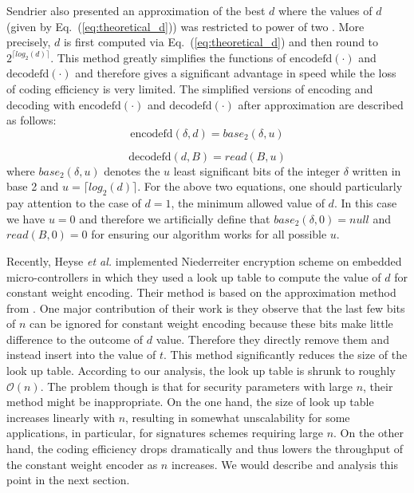 \documentclass[10pt,journal,compsoc]{IEEEtran}
\begin{document}
Sendrier also presented an approximation of the best $d$ where the values of $d$ (given by Eq.~(\ref{eq:theoretical_d})) was restricted to power of two \cite{sendrier2005encoding}. More precisely, $d$ is first computed via Eq.~(\ref{eq:theoretical_d}) and then round to $2^{\lceil log_2(d)\rceil}$.
This method greatly simplifies the functions of $\text{encodefd}(\cdot)$ and $\text{decodefd}(\cdot)$  and therefore gives a significant advantage in speed while the loss of coding efficiency is very limited.  The simplified versions of encoding and decoding with $\text{encodefd}(\cdot)$ and $\text{decodefd}(\cdot)$ after approximation are described as follows:
\begin{equation}
\text{encodefd}(\delta,d) = base_2(\delta,u)
\end{equation}

\begin{equation}
\text{decodefd}(d,B) = read(B,u)
\end{equation}
where $base_2(\delta,u)$ denotes the $u$ least significant bits of the integer $\delta$ written in base 2 and $u = {\lceil log_2(d)\rceil}$. For the
above two equations, one should particularly pay attention to the case of $d=1$, the minimum allowed value of $d$. In this case we have $u=0$
and therefore we artificially define that $base_2(\delta,0) = null$ and $read(B,0)=0$ for ensuring our algorithm works for all possible $u$.

Recently, Heyse \textit{et al.} implemented Niederreiter encryption scheme on embedded micro-controllers in which they used a look up table to
compute the value of $d$ for constant weight encoding\cite{heyse2010low}. Their method is based on the approximation method from \cite{sendrier2005encoding}.
One major contribution of their work is they observe that the last few bits of $n$ can be ignored for constant weight encoding because
these bits make little difference to the outcome of $d$ value. Therefore they directly remove them and instead insert into the value of $t$.
This method significantly reduces the size of the look up table. According to our analysis, the look up table is shrunk to roughly $\mathcal{O}(n)$.
The problem though is that for security parameters with large $n$, their method might be inappropriate.
On the one hand, the size of look up table increases linearly with $n$, resulting in somewhat unscalability for some applications, in particular, for signatures schemes requiring large $n$.
On the other hand, the coding efficiency drops dramatically and thus lowers the throughput of the constant weight encoder as $n$ increases. We would describe and analysis this point in the next section.
\end{document}
